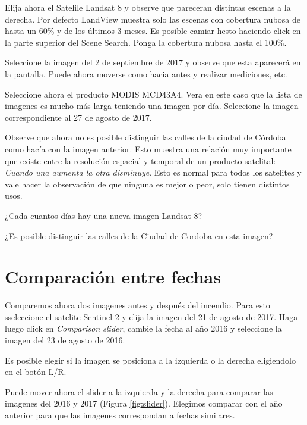 \documentclass[a4paper,10pt]{article}
\begin{document}
\begin{figure}[h!]
    \centering
    \caption{}
    \label{fig:aoi}
\end{figure}

Elija ahora el Satelile Landsat 8 y observe que pareceran distintas escenas a la derecha. Por defecto LandView muestra solo las escenas con cobertura nubosa de hasta un 60\% y de los últimos 3 meses. Es posible camiar hesto haciendo click en la parte superior del Scene Search.  Ponga la cobertura nubosa hasta el 100\%.

Seleccione la imagen del 2 de septiembre de 2017 y observe que esta aparecerá en la pantalla. Puede ahora moverse como hacia antes y realizar mediciones, etc.

Seleccione ahora el producto MODIS MCD43A4. Vera en este caso que la lista de imagenes es mucho más larga teniendo una imagen por día. Seleccione la imagen correspondiente al 27 de agosto de 2017.

Observe que ahora no es posible distinguir las calles de la ciudad de Córdoba como hacía con la imagen anterior. Esto muestra una relación muy importante que existe entre la resolución espacial y temporal de un producto satelital: \emph{Cuando una aumenta la otra disminuye}. Esto es normal para todos los satelites y vale hacer la observación de que ninguna es mejor o peor, solo tienen distintos usos.

\begin{que}
    ¿Cada cuantos días hay una nueva imagen Landsat 8?
\end{que}

\begin{que}
    ¿Es posible distinguir las calles de la Ciudad de Cordoba en esta imagen?
\end{que}

\section{Comparación entre fechas}
Comparemos ahora dos imagenes antes y después del incendio. Para esto sseleccione el satelite Sentinel 2 y elija la imagen del 21 de agosto de 2017. Haga luego click en \emph{Comparison slider}, cambie la fecha al año 2016 y seleccione la imagen del 23 de agosto de 2016.

Es posible elegir si la imagen se posiciona a la izquierda o la derecha eligiendolo en el botón L/R.

Puede mover ahora el slider a la izquierda y la derecha para comparar las imagenes del 2016 y 2017 (Figura \ref{fig:slider}). Elegimos comparar con el año anterior para que las imagenes correspondan a fechas similares.
\end{document}
